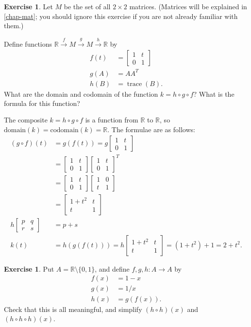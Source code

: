 \documentclass[a4paper]{book}
\newcommand{\R}         {{\mathbb{R}}}
\newcommand{\bbm}       {\begin{bmatrix}}
\newcommand{\bsm}       {\left[\begin{smallmatrix}}
\newcommand{\ebm}       {\end{bmatrix}}
\newcommand{\esm}       {\end{smallmatrix}\right]}
\newcommand{\tm}        {\times}
\newcommand{\sm}        {\setminus}
\newcommand{\xra}       {\xrightarrow}
\newcommand{\trc}       {\operatorname{trace}}
\renewcommand{\:}{\colon}
\theoremstyle{definition}
\newtheorem{exercise}[theorem]{Exercise}
\renewenvironment{solution}{\SolutionInline}{\endSolutionInline}
\begin{document}
\begin{exercise}
 Let $M$ be the set of all $2\tm 2$ matrices.  (Matrices will be
 explained in \autoref{chap-mat}; you should ignore this exercise if
 you are not already familiar with them.)

 Define functions $\R\xra{f}M\xra{g}M\xra{h}\R$ by 
 \begin{align*}
  f(t) &= \bsm 1 & t \\ 0 & 1 \esm \\
  g(A) &= AA^T \\
  h(B) &= \trc(B).
 \end{align*}
 What are the domain and codomain of the function $k=h\circ g\circ f$?
 What is the formula for this function?
\end{exercise}
\begin{solution}
 The composite $k=h\circ g\circ f$ is a function from $\R$ to $\R$, so
 $\text{domain}(k)=\text{codomain}(k)=\R$.  The formulae are as
 follows: 
 \begin{align*}
  (g\circ f)(t) &= g(f(t)) = g\bbm 1 & t \\ 0 & 1\ebm \\
    &= \bbm 1 & t \\ 0 & 1 \ebm \bbm 1 & t \\ 0 & 1 \ebm^T \\
    &= \bbm 1 & t \\ 0 & 1 \ebm \bbm 1 & 0 \\ t & 1 \ebm \\
    &= \bbm 1+t^2 & t \\ t & 1 \ebm \\
  h\bbm p & q \\ r & s \ebm &= p+s \\
  k(t) &= h(g(f(t))) = h\bbm 1+t^2 & t \\ t & 1 \ebm 
        = (1+t^2)+1 = 2+t^2.
 \end{align*}
\end{solution}
\begin{exercise}
 Put $A=\R\sm\{0,1\}$, and define $f,g,h\:A\xra{}A$ by 
 \begin{align*}
  f(x) &= 1-x \\
  g(x) &= 1/x \\
  h(x) &= g(f(x)).
 \end{align*}
 Check that this is all meaningful, and simplify
 $(h\circ h)(x)$ and $(h\circ h\circ h)(x)$.
\end{exercise}
\end{document}
